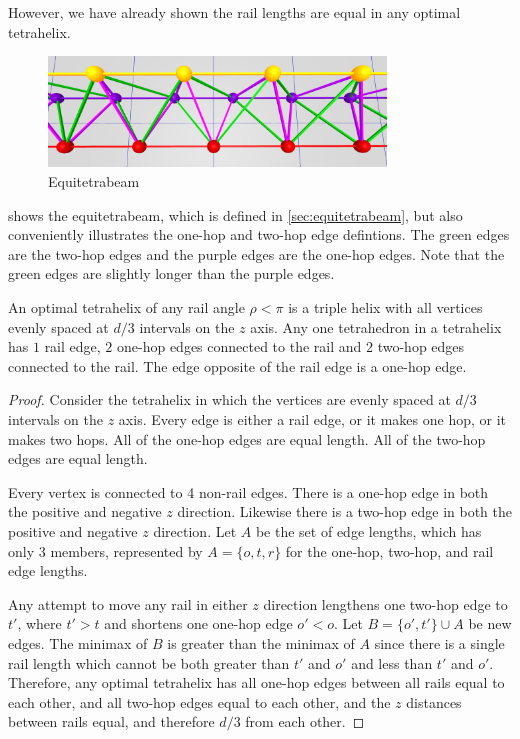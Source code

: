 \documentclass[review]{siamonline1116}
\begin{document}
 However, we have already shown the rail
 lengths are equal in any optimal tetrahelix.

\begin{figure}[H]
     \centering
     \includegraphics[width=0.8\textwidth]{figures/EquitetrabeamCloseUp.png}
     \caption{Equitetrabeam}
  \label{fig:equitetrabeam}
\end{figure}

 shows the equitetrabeam, which is defined in \cref{sec:equitetrabeam},
but also conveniently illustrates the one-hop and two-hop edge defintions.
The green edges are the two-hop edges and the purple edges are the one-hop edges. Note that the green
edges are slightly longer than the purple edges.


\begin{theorem}
  \label{eventhirds}
  An optimal tetrahelix of any rail angle $\rho < \pi$ is a triple helix with all vertices evenly spaced at $d/3$ intervals on the $z$ axis.
  Any one tetrahedron in a tetrahelix has $1$ rail edge, $2$ one-hop edges connected to the rail and $2$ two-hop edges connected to the rail.
  The edge opposite of the rail edge is a one-hop edge.
\end{theorem}

\begin{proof}
    Consider the tetrahelix in which the vertices are evenly spaced at
    $d/3$ intervals on the $z$ axis. Every edge is either a rail edge,
    or it makes one hop, or it makes two hops. All of the one-hop
    edges are equal length.  All of the two-hop edges are equal
    length.

    Every vertex is connected to 4 non-rail edges. There is a one-hop edge
    in both the positive and negative $z$ direction. Likewise there is a two-hop
    edge in both the positive and negative $z$ direction. Let $A$ be the set
    of edge lengths, which has only 3 members, represented by $A = \{o,t,r\}$ for
    the one-hop, two-hop, and rail edge lengths.

    Any attempt to move any rail in either $z$ direction lengthens one two-hop edge to $t'$, where $t' > t$
    and shortens one one-hop edge $o' < o$. Let $B = \{o',t' \} \cup A$ be new edges.
    The minimax of $B$ is greater than the minimax of $A$ since there is a single rail length which cannot be both greater
    than $t'$ and $o'$ and less than $t'$ and $o'$.
    Therefore, any optimal tetrahelix has all one-hop edges between all rails equal to each other, and
    all two-hop edges equal to each other, and the $z$ distances between rails equal, and therefore
    $d/3$ from each other.

\end{proof}
\end{document}
